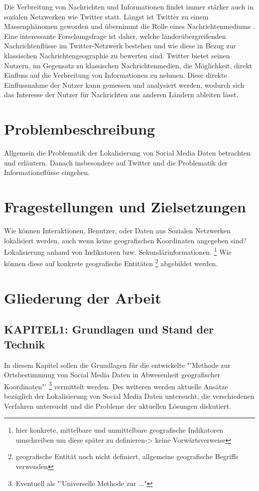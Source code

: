 		Die Verbreitung von Nachrichten und Informationen findet immer stärker auch in sozialen Netzwerken wie Twitter statt. 
		Längst ist Twitter zu einem Massenphänomen geworden und übernimmt die Rolle eines Nachrichtenmediums \cite{Petrovic2013}.
		Eine interessante Forschungsfrage ist daher, welche län\-der\-ü\-ber\-grei\-fen\-den Nachrichtenflüsse im Twit\-ter-Netz\-werk bestehen und wie diese in Bezug zur klassischen Nachrichtengeographie zu bewerten sind. 
		Twitter bietet seinen Nutzern, im Gegensatz zu klassischen Nachrichtenmedien, die Möglichkeit, direkt Einfluss auf die Verbreitung von Informationen zu nehmen. Diese direkte Einflussnahme der Nutzer kann gemessen und analysiert werden, wodurch sich das Interesse der Nutzer für Nachrichten aus anderen Ländern ableiten lässt.

	\section{Problembeschreibung} 
	Allgemein die Problematik der Lokalisierung von Social Media Daten betrachten und erläutern.
	Danach insbesondere auf Twitter und die Problematik der Informationsflüsse eingehen.

	\section{Fragestellungen und Zielsetzungen}
	Wie können Interaktionen, Benutzer, oder Daten aus Sozialen Netzwerken lokalisiert werden, auch wenn keine geografischen Koordinaten angegeben sind? 
	Lokalisierung anhand von Indikatoren bzw. Sekundärinformationen.
	\footnote{hier konkrete, mittelbare und unmittelbare geografische Indikatoren umschreiben um diese später zu definieren-> keine Vorwärtsverweise} 
	Wie können diese auf konkrete geografische Entitäten \footnote{geografische Entität noch nicht definiert, allgemeine geografische Begriffe verwenden}  abgebildet werden. 

	\section{Gliederung der Arbeit}

		\subsection*{KAPITEL1: Grundlagen und Stand der Technik}
			In diesem Kapitel sollen die Grundlagen für die entwickelte "'Methode zur Ortsbestimmung von Social Media Daten in Abwesenheit geografischer Koordinaten"' \footnote{Eventuell als "'Universelle Methode zur ..."} vermittelt werden. 
			Des weiteren werden aktuelle Ansätze bezüglich der Lokalisierung von Social Media Daten untersucht, die verschiedenen Verfahren untersucht und die Probleme der aktuellen Lösungen diskutiert.

